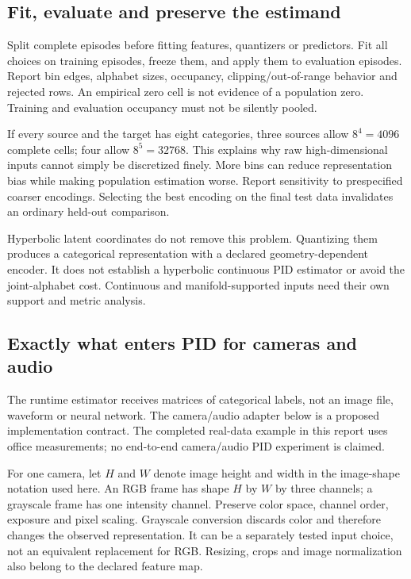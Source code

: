 \documentclass[11pt,a4paper]{article}
\begin{document}
\par{}

\subsection{Fit, evaluate and preserve the estimand}\label{fit-evaluate-and-preserve-the-estimand}

Split complete episodes before fitting features, quantizers or predictors. Fit all choices on training episodes, freeze them, and apply them to evaluation episodes. Report bin edges, alphabet sizes, occupancy, clipping/out-of-range behavior and rejected rows. An empirical zero cell is not evidence of a population zero. Training and evaluation occupancy must not be silently pooled.

If every source and the target has eight categories, three sources allow \(8^4=4096\) complete cells; four allow \(8^5=32768\). This explains why raw high-dimensional inputs cannot simply be discretized finely. More bins can reduce representation bias while making population estimation worse. Report sensitivity to prespecified coarser encodings. Selecting the best encoding on the final test data invalidates an ordinary held-out comparison.

Hyperbolic latent coordinates do not remove this problem. Quantizing them produces a categorical representation with a declared geometry-dependent encoder. It does not establish a hyperbolic continuous PID estimator or avoid the joint-alphabet cost. Continuous and manifold-supported inputs need their own support and metric analysis.

\par{}

\subsection{Exactly what enters PID for cameras and audio}\label{exactly-what-enters-pid-for-cameras-and-audio}

The runtime estimator receives matrices of categorical labels, not an image file, waveform or neural network. The camera/audio adapter below is a proposed implementation contract. The completed real-data example in this report uses office measurements; no end-to-end camera/audio PID experiment is claimed.

For one camera, let \(H\) and \(W\) denote image height and width in the image-shape notation used here. An RGB frame has shape \(H\) by \(W\) by three channels; a grayscale frame has one intensity channel. Preserve color space, channel order, exposure and pixel scaling. Grayscale conversion discards color and therefore changes the observed representation. It can be a separately tested input choice, not an equivalent replacement for RGB. Resizing, crops and image normalization also belong to the declared feature map.
\end{document}
